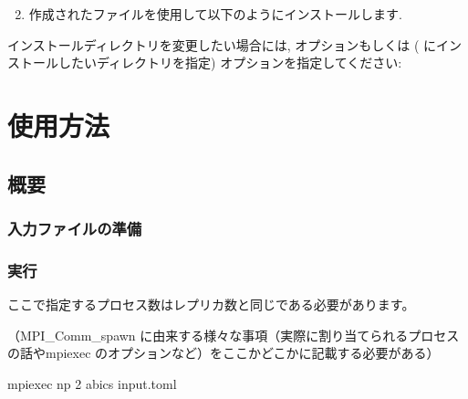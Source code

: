 \documentclass[letterpaper,10pt,dvipdfmx]{sphinxmanual}
\begin{document}
\begin{enumerate}
\setcounter{enumi}{1}
\item {} 
作成されたファイルを使用して以下のようにインストールします.

\end{enumerate}


インストールディレクトリを変更したい場合には,  オプションもしくは  (  にインストールしたいディレクトリを指定) オプションを指定してください:



\chapter{使用方法}
\label{\detokenize{how_to_use/index::doc}}\label{\detokenize{how_to_use/index:id1}}

\section{概要}
\label{\detokenize{how_to_use/basic_usage::doc}}\label{\detokenize{how_to_use/basic_usage:id1}}

\subsection{入力ファイルの準備}
\label{\detokenize{how_to_use/basic_usage:id2}}

\subsection{実行}
\label{\detokenize{how_to_use/basic_usage:id3}}
ここで指定するプロセス数はレプリカ数と同じである必要があります。

（MPI\_Comm\_spawn に由来する様々な事項（実際に割り当てられるプロセスの話やmpiexec のオプションなど）をここかどこかに記載する必要がある）

\begin{sphinxVerbatim}[commandchars=\\\{\}]
\PYGZdl{} mpiexec \PYGZhy{}np 2 abics input.toml
\end{sphinxVerbatim}
\end{document}
